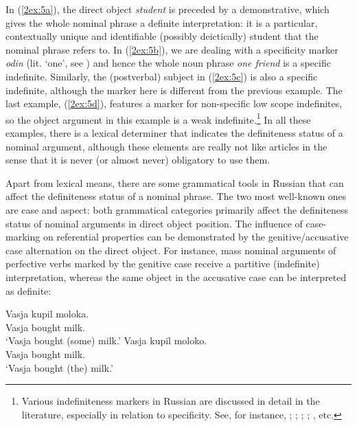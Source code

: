 \documentclass[output=paper]{langsci/langscibook}
\begin{document}
In (\ref{2ex:5a}), the direct object {\emph{student}} is preceded by a demonstrative, which gives the whole nominal phrase a definite interpretation: it is a particular, contextually unique and identifiable (possibly deictically) student that the nominal phrase refers to. In (\ref{2ex:5b}), we are dealing with a specificity marker {\emph{odin}} (lit. `one', see \citealt{ionin:13}) and hence the whole noun phrase {\emph{one friend}} is a specific indefinite. Similarly, the (postverbal) subject in (\ref{2ex:5c}) is also a specific indefinite, although the marker here is different from the previous example. The last example, (\ref{2ex:5d}), features a marker for non-specific low scope indefinites, so the object argument in this example is a weak indefinite.\footnote{Various indefiniteness markers in Russian are discussed in detail in the literature, especially in relation to specificity. See, for instance, \cite{haspelmath:97}; \cite{pereltsvaig:00}; \cite{yanovich:05}; \cite{geist:08}; \cite{ionin:13}, etc.} In all these examples, there is a lexical determiner that indicates the definiteness status of a nominal argument, although these elements are really not like articles in the sense that it is never (or almost never) obligatory to use them.

Apart from lexical means, there are some grammatical tools in Russian that can affect the definiteness status of a nominal phrase. The two most well-known ones are case and aspect: both grammatical categories primarily affect the definiteness status of nominal arguments in direct object position. The influence of case-marking on referential properties can be demonstrated by the genitive/accusative case alternation on the direct object. For instance, mass nominal arguments of perfective verbs marked by the genitive case receive a partitive (indefinite) interpretation, whereas the same object in the accusative case can be interpreted as definite: 

\begin{exe}
\ex\label{2ex:6}
	\begin{xlista}
	\ex\label{2ex:6a}
 	\gll 	Vasja	kupil 		moloka. \\
		Vasja 	bought 	milk.{} 	\\
	\glt	`Vasja bought (some) milk.'
	\ex\label{2ex:6b}
	\gll	Vasja 	kupil 		moloko. \\
		Vasja 	bought 	milk.{} \\
	\glt	`Vasja bought (the) milk.'
	\end{xlista}
\end{exe}
\end{document}
